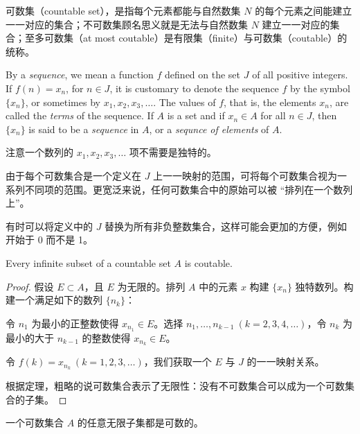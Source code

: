 \documentclass[../poma-notes.tex]{subfiles}
\begin{document}
\begin{anote}
  可数集（countable set），是指每个元素都能与自然数集 $N$ 的每个元素之间能建立一一对应的集合；不可数集顾名思义就是无法与自然数集
  $N$ 建立一一对应的集合；至多可数集（at most coutable）是有限集（finite）与可数集（coutable）的统称。
\end{anote}

\setcounter{poma}{6}

\begin{definition}
  By a \textit{sequence}, we mean a function $f$ defined on the set $J$ of all positive integers. If $f(n)=x_n$,
  for $n \in J$, it is customary to denote the sequence $f$ by the symbol $\{x_n\}$, or sometimes by $x_1,x_2,x_3,\dots$.
  The values of $f$, that is, the elements $x_n$, are called the \textit{terms} of the sequence. If $A$ is a set and
  if $x_n \in A$ for all $n \in J$, then $\{x_n\}$ is said to be a \textit{sequence} in $A$, or a \textit{sequnce of elements}
  of $A$.
\end{definition}

注意一个数列的 $x_1,x_2,x_3,\dots$ 项不需要是独特的。

由于每个可数集合是一个定义在 $J$ 上一一映射的范围，可将每个可数集合视为一系列不同项的范围。更宽泛来说，任何可数集合中的原始可以被
“排列在一个数列上”。

有时可以将定义中的 $J$ 替换为所有非负整数集合，这样可能会更加的方便，例如开始于 0 而不是 1。

\begin{theorem}
  Every infinite subset of a countable set $A$ is coutable.
\end{theorem}

\begin{proof}
  假设 $E \subset A$，且 $E$ 为无限的。排列 $A$ 中的元素 $x$ 构建 $\{x_n\}$ 独特数列。构建一个满足如下的数列 $\{n_k\}$：

  令 $n_1$ 为最小的正整数使得 $x_{n_1} \in E$。选择 $n_1,\dots,n_{k-1} \ (k=2,3,4,\dots)$，令 $n_k$ 为最小的大于 $n_{k-1}$
  的整数使得 $x_{n_k} \in E$。

  令 $f(k)=x_{n_k} \ (k=1,2,3,\dots)$，我们获取一个 $E$ 与 $J$ 的一一映射关系。

  根据定理，粗略的说可数集合表示了无限性：没有不可数集合可以成为一个可数集合的子集。
\end{proof}

\begin{anote}
  一个可数集合 $A$ 的任意无限子集都是可数的。
\end{anote}
\end{document}
